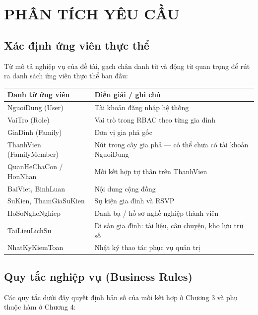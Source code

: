 \chapter{PHÂN TÍCH YÊU CẦU}

\section{Xác định ứng viên thực thể}

Từ mô tả nghiệp vụ của đề tài, gạch chân danh từ và động từ quan trọng để rút ra danh sách ứng viên thực thể ban đầu:

\begin{center}
\begin{tabularx}{\linewidth}{@{}l>{\raggedright\arraybackslash}X@{}}
\toprule
\textbf{Danh từ ứng viên} & \textbf{Diễn giải / ghi chú} \\
\midrule
NguoiDung (User) & Tài khoản đăng nhập hệ thống \\
VaiTro (Role) & Vai trò trong RBAC theo từng gia đình \\
GiaDinh (Family) & Đơn vị gia phả gốc \\
ThanhVien (FamilyMember) & Nút trong cây gia phả --- có thể chưa có tài khoản NguoiDung \\
QuanHeChaCon / HonNhan & Mối kết hợp tự thân trên ThanhVien \\
BaiViet, BinhLuan & Nội dung cộng đồng \\
SuKien, ThamGiaSuKien & Sự kiện gia đình và RSVP \\
HoSoNgheNghiep & Danh bạ / hồ sơ nghề nghiệp thành viên \\
TaiLieuLichSu & Di sản gia đình: tài liệu, câu chuyện, kho lưu trữ số \\
NhatKyKiemToan & Nhật ký thao tác phục vụ quản trị \\
\bottomrule
\end{tabularx}
\end{center}

\section{Quy tắc nghiệp vụ (Business Rules)}

Các quy tắc dưới đây quyết định bản số của mối kết hợp ở Chương 3 và phụ thuộc hàm ở Chương 4:

